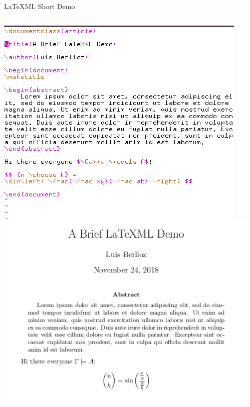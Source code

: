 \documentclass[9pt]{beamer}
\begin{document}
\begin{frame}{LaTeXML Short Demo}
    \begin{columns}[T]
        \begin{column}{0.5\textwidth}
    \includegraphics[width=\textwidth]{ltxml_demo_vim.png}
    \includegraphics[width=\textwidth]{demo_pdf.png}
        \end{column}
        \begin{column}{0.5\textwidth}

\end{column}
\end{columns}
\end{frame}
\end{document}
